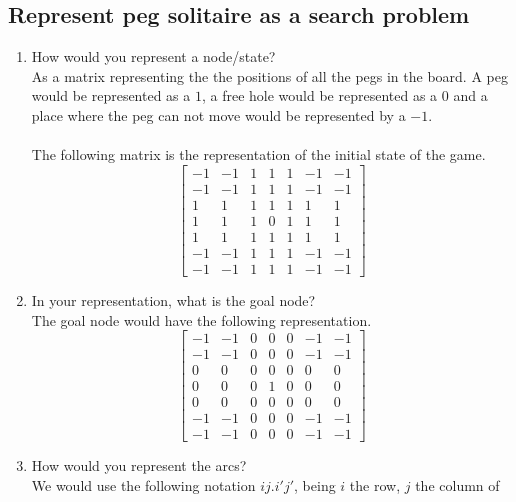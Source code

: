 \documentclass{article}
\def\ans#1{{\color{ans}#1}}
\begin{document}
\subsection{Represent peg solitaire as a search problem}
\begin{enumerate}[label=(\alph*)]
    \item How would you represent a node/state?\\
    \ans{
        As a matrix representing the the positions of all the pegs in the board. A peg would 
        be represented as a $1$, a free hole would be represented as a $0$ and a place 
        where the peg can not move would be represented by a $-1$.\\ \\ The following matrix 
        is the representation of the initial state of the game.
        \[ \left[ 
        \begin{array}{ccccccc}
        -1 & -1 & 1 & 1 & 1 & -1 & -1 \\
        -1 & -1 & 1 & 1 & 1 & -1 & -1 \\
        1 & 1 & 1 & 1 & 1 & 1 & 1 \\
        1 & 1 & 1 & 0 & 1 & 1 & 1 \\
        1 & 1 & 1 & 1 & 1 & 1 & 1 \\
        -1 & -1 & 1 & 1 & 1 & -1 & -1 \\
        -1 & -1 & 1 & 1 & 1 & -1 & -1 
        \end{array} 
        \right]\] 
    }
    \item In your representation, what is the goal node? \\
    \ans{
        The goal node would have the following representation.
        \[ \left[ 
        \begin{array}{ccccccc}
        -1 & -1 & 0 & 0 & 0 & -1 & -1 \\
        -1 & -1 & 0 & 0 & 0 & -1 & -1 \\
        0 & 0 & 0 & 0 & 0 & 0 & 0 \\
        0 & 0 & 0 & 1 & 0 & 0 & 0 \\
        0 & 0 & 0 & 0 & 0 & 0 & 0 \\
        -1 & -1 & 0 & 0 & 0 & -1 & -1 \\
        -1 & -1 & 0 & 0 & 0 & -1 & -1 
        \end{array} 
        \right]\] 
    }
    \item How would you represent the arcs? \\
    \ans{
        We would use the following notation $ij.i'j'$, being $i$ the row, $j$ the column of 
}
\end{enumerate}
\end{document}
